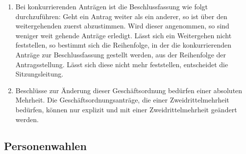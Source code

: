 \documentclass[draft,12pt,oneside]{scrreprt}
\begin{document}
\begin{enumerate}
\item Bei konkurrierenden Anträgen ist die Beschlussfassung wie folgt durchzuführen:
      Geht ein Antrag weiter als ein anderer, so ist über den weitergehenden
      zuerst abzustimmen.
      Wird dieser angenommen, so sind weniger weit gehende Anträge erledigt.
      Lässt sich ein Weitergehen nicht feststellen, so bestimmt sich die
      Reihenfolge, in der die konkurrierenden Anträge zur Beschlussfassung
      gestellt werden, aus der Reihenfolge der Antragsstellung.
      Lässt sich diese nicht mehr feststellen, entscheidet die Sitzungsleitung.

\item Beschlüsse zur Änderung dieser Geschäftsordnung bedürfen einer absoluten
      Mehrheit.
      Die Geschäftsordnungsanträge, die einer Zweidrittelmehrheit bedürfen, können nur
      explizit und mit einer Zweidrittelmehrheit geändert werden.
\end{enumerate}

\subsection{Personenwahlen}
\end{document}

